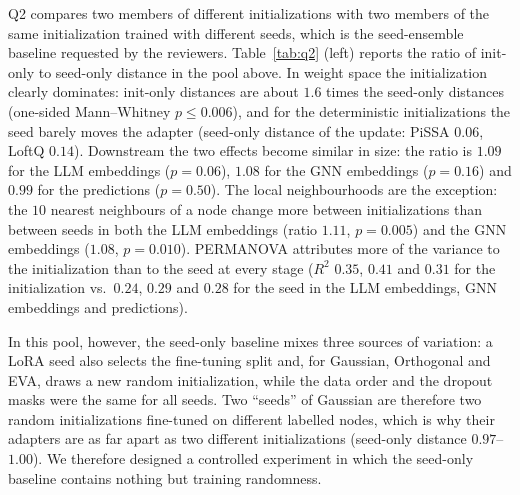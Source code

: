 \documentclass[a4paper,fleqn]{cas-sc}
\DeclareRobustCommand{\revcommon}[2][]{\textcolor{revshared}{#2}} %
\begin{document}
\revcommon[R1,R2,R4]{Q2 compares two members of different initializations with two members of the same initialization trained with different seeds, which is the seed-ensemble baseline requested by the reviewers. Table~\ref{tab:q2} (left) reports the ratio of init-only to seed-only distance in the pool above. In weight space the initialization clearly dominates: init-only distances are about $1.6$ times the seed-only distances (one-sided Mann--Whitney $p\leq0.006$), and for the deterministic initializations the seed barely moves the adapter (seed-only distance of the update: PiSSA $0.06$, LoftQ $0.14$). Downstream the two effects become similar in size: the ratio is $1.09$ for the LLM embeddings ($p=0.06$), $1.08$ for the GNN embeddings ($p=0.16$) and $0.99$ for the predictions ($p=0.50$). The local neighbourhoods are the exception: the $10$ nearest neighbours of a node change more between initializations than between seeds in both the LLM embeddings (ratio $1.11$, $p=0.005$) and the GNN embeddings ($1.08$, $p=0.010$). PERMANOVA attributes more of the variance to the initialization than to the seed at every stage ($R^2$ $0.35$, $0.41$ and $0.31$ for the initialization vs.\ $0.24$, $0.29$ and $0.28$ for the seed in the LLM embeddings, GNN embeddings and predictions).}

\revcommon[R1,R2,R4]{In this pool, however, the seed-only baseline mixes three sources of variation: a LoRA seed also selects the fine-tuning split and, for Gaussian, Orthogonal and EVA, draws a new random initialization, while the data order and the dropout masks were the same for all seeds. Two ``seeds'' of Gaussian are therefore two random initializations fine-tuned on different labelled nodes, which is why their adapters are as far apart as two different initializations (seed-only distance $0.97$--$1.00$). We therefore designed a controlled experiment in which the seed-only baseline contains nothing but training randomness.}
\end{document}
